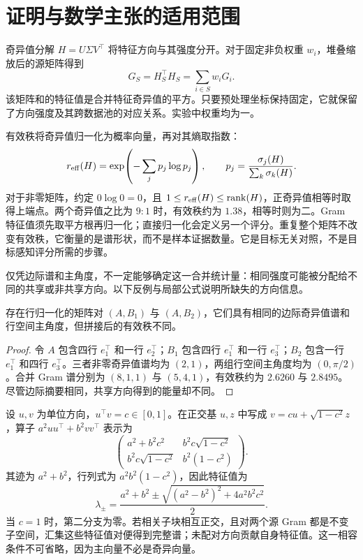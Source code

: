 \section{证明与数学主张的适用范围}
\label{app:proofs}
奇异值分解 $H=U\Sigma V^\top$ 将特征方向与其强度分开。对于固定非负权重 $w_i$，堆叠缩放后的源矩阵得到
\begin{equation}
 G_S=H_S^\top H_S=\sum_{i\in S}w_iG_i.
 \label{eq:gram}
\end{equation}
该矩阵和的特征值是合并特征奇异值的平方。只要预处理坐标保持固定，它就保留了方向强度及其跨数据池的对应关系。实验中权重均为一。

有效秩将奇异值归一化为概率向量，再对其熵取指数\citep{roy2007}：
\begin{equation}
 r_{\mathrm{eff}}(H)=\exp\!\left(-\sum_j p_j\log p_j\right),\qquad
 p_j=\frac{\sigma_j(H)}{\sum_k\sigma_k(H)}.
 \label{eq:rank}
\end{equation}
对于非零矩阵，约定 $0\log0=0$，且 $1\leq r_{\mathrm{eff}}(H)\leq\operatorname{rank}(H)$，正奇异值相等时取得上端点。两个奇异值之比为 $9:1$ 时，有效秩约为 $1.38$，相等时则为二。Gram 特征值须先取平方根再归一化；直接归一化会定义另一个评分。重复整个矩阵不改变有效秩，它衡量的是谱形状，而不是样本证据数量。它是目标无关对照，不是目标感知评分所需的步骤。

仅凭边际谱和主角度，不一定能够确定这一合并统计量：相同强度可能被分配给不同的共享或非共享方向。以下反例与局部公式说明所缺失的方向信息。

\begin{proposition}[方向分配影响合并结果]
存在行归一化的矩阵对 $(A,B_1)$ 与 $(A,B_2)$，它们具有相同的边际奇异值谱和行空间主角度，但拼接后的有效秩不同。
\end{proposition}
\begin{proof}
令 $A$ 包含四行 $e_1^\top$ 和一行 $e_2^\top$；$B_1$ 包含四行 $e_1^\top$ 和一行 $e_3^\top$；$B_2$ 包含一行 $e_1^\top$ 和四行 $e_3^\top$。三者非零奇异值谱均为 $(2,1)$，两组行空间主角度均为 $(0,\pi/2)$。合并 Gram 谱分别为 $(8,1,1)$ 与 $(5,4,1)$，有效秩约为 $2.6260$ 与 $2.8495$。尽管边际摘要相同，共享方向得到的能量却不同。
\end{proof}

设 $u,v$ 为单位方向，$u^\top v=c\in[0,1]$。在正交基 $u,z$ 中写成 $v=cu+\sqrt{1-c^2}z$，算子 $a^2uu^\top+b^2vv^\top$ 表示为
\begin{equation}
 \begin{pmatrix}
 a^2+b^2c^2 & b^2c\sqrt{1-c^2}\\
 b^2c\sqrt{1-c^2} & b^2(1-c^2)
 \end{pmatrix}.
\end{equation}
其迹为 $a^2+b^2$，行列式为 $a^2b^2(1-c^2)$，因此特征值为
\begin{equation}
 \lambda_{\pm}=\frac{a^2+b^2\pm\sqrt{(a^2-b^2)^2+4a^2b^2c^2}}{2}.
 \label{eq:local}
\end{equation}
当 $c=1$ 时，第二分支为零。若相关子块相互正交，且对两个源 Gram 都是不变子空间，汇集这些特征值对便得到完整谱；未配对方向贡献自身特征值。这一相容条件不可省略，因为主向量不必是奇异向量。

